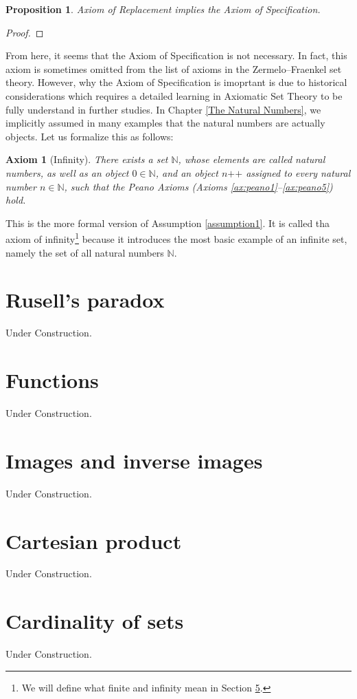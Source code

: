 \documentclass[a4paper,oneside]{book}
\newtheorem*{proof}{\textit{Proof.}}
\newtheorem{axiom}{Axiom}[chapter]
\newtheorem{proposition}{Proposition}[section]
\begin{document}
			\begin{proposition}
				Axiom of Replacement implies the Axiom of Specification.
			\end{proposition}
			\begin{proof}
				
			\end{proof}
			From here, it seems that the Axiom of Specification is not necessary. In fact, this axiom is sometimes omitted from the list of axioms in the Zermelo–Fraenkel set theory. However, why the Axiom of Specification is imoprtant is due to historical considerations which requires a detailed learning in Axiomatic Set Theory to be fully understand in further studies.
			In Chapter \ref{The Natural Numbers}, we implicitly assumed in many examples that the natural numbers are actually objects. Let us formalize this as follows:
			\begin{axiom}[Infinity]
				There exists a set $\mathbb{N}$, whose elements are called natural numbers, as well as an object $0\in\mathbb{N}$, and an object $n\texttt{++}$ assigned to every natural number $n\in\mathbb{N}$, such that the Peano Axioms (Axioms \ref{ax:peano1}--\ref{ax:peano5}) hold.
			\end{axiom}
			This is the more formal version of Assumption \ref{assumption1}. It is called tha axiom of infinity\footnote{We will define what finite and infinity mean in Section \ref{Cardinality of sets}.} because it introduces the most basic example of an infinite set, namely the set of all natural numbers $\mathbb{N}$.
		\section{Rusell's paradox}
			Under Construction.
		\section{Functions}
			Under Construction.
		\section{Images and inverse images}
			Under Construction.
		\section{Cartesian product}
			Under Construction.
		\section{Cardinality of sets}
			\label{Cardinality of sets}
			Under Construction.
\end{document}
